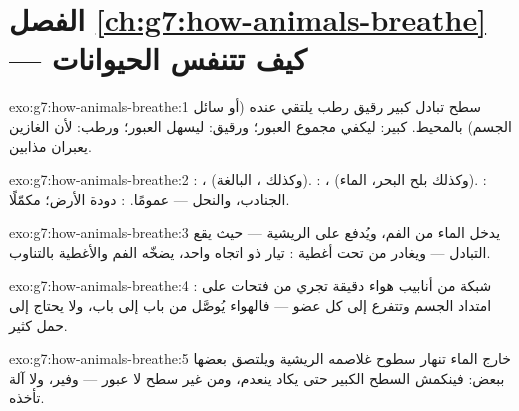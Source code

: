 \section*{الفصل \ref{ch:g7:how-animals-breathe} --- كيف تتنفس الحيوانات}

\begin{solution}{exo:g7:how-animals-breathe:1}
سطح تبادل كبير رقيق رطب يلتقي عنده  (أو سائل الجسم) بالمحيط.
كبير: ليكفي مجموع العبور؛ ورقيق: ليسهل العبور؛ ورطب: لأن الغازين
يعبران مذابين.
\end{solution}

\begin{solution}{exo:g7:how-animals-breathe:2}
: ،  (وكذلك ،  البالغة).
: ،  (وكذلك بلح البحر،  الماء).
: الجنادب، والنحل ---  عمومًا. : دودة الأرض؛  مكمّلًا.
\end{solution}

\begin{solution}{exo:g7:how-animals-breathe:3}
يدخل الماء من الفم، ويُدفع على  الريشية --- حيث يقع التبادل
--- ويغادر من تحت أغطية : تيار ذو اتجاه واحد، يضخّه الفم
والأغطية بالتناوب.
\end{solution}

\begin{solution}{exo:g7:how-animals-breathe:4}
: شبكة من أنابيب هواء دقيقة تجري من فتحات على
امتداد الجسم وتتفرع إلى كل عضو --- فالهواء يُوصَّل من باب إلى باب،
ولا يحتاج  إلى حمل كثير.
\end{solution}

\begin{solution}{exo:g7:how-animals-breathe:5}
خارج الماء تنهار سطوح غلاصمه الريشية ويلتصق بعضها ببعض: فينكمش
السطح الكبير حتى يكاد ينعدم، ومن غير سطح لا عبور ---  وفير،
ولا آلة تأخذه.
\end{solution}

